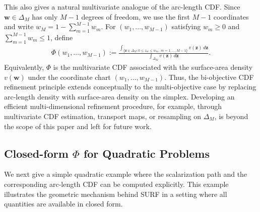\documentclass{article}
\newcommand{\bw}{\mathbf{w}}
\newcommand{\Farc}{\Phi}
\begin{document}
This also gives a natural multivariate analogue of the arc-length CDF. Since $\bw\in\Delta_M$ has only $M-1$ degrees of freedom, we use the first $M-1$ coordinates and write $w_M=1-\sum_{m=1}^{M-1}w_m$. For $(w_1,\dots,w_{M-1})$ satisfying $w_m\ge 0$ and $\sum_{m=1}^{M-1}w_m\le 1$, define
\begin{align}
\Farc(w_1,\dots,w_{M-1}):=\frac{\int_{\{\mathbf{z}\in\Delta_M:0\le z_m\le w_m,\ m=1,\dots,M-1\}} v(\mathbf{z})\,d\mathbf{z}}{\int_{\Delta_M}v(\mathbf{z})\,d\mathbf{z}}.
\end{align}
Equivalently, $\Farc$ is the multivariate CDF associated with the surface-area density $v(\bw)$ under the coordinate chart $(w_1,\dots,w_{M-1})$. Thus, the bi-objective CDF refinement principle extends conceptually to the multi-objective case by replacing arc-length density with surface-area density on the simplex. Developing an efficient multi-dimensional refinement procedure, for example, through multivariate CDF estimation, transport maps, or resampling on $\Delta_M$, is beyond the scope of this paper and left for future work.

\subsection{Closed-form $\Farc$ for Quadratic Problems}
\label{app:quadratic}
We next give a simple quadratic example where the scalarization path and the corresponding arc-length CDF can be computed explicitly. This example illustrates the geometric mechanism behind SURF in a setting where all quantities are available in closed form.
\end{document}
